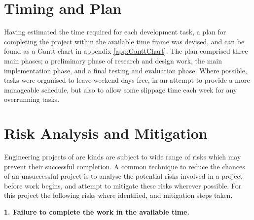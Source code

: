 
\section{Timing and Plan}

Having estimated the time required for each development task, a plan for completing the project within the available time frame was devised, and can be found as a Gantt chart in appendix \ref{app:GanttChart}. The plan comprised three main phases; a preliminary phase of research and design work, the main implementation phase, and a final testing and evaluation phase. Where possible, tasks were organised to leave weekend days free, in an attempt to provide a more manageable schedule, but also to allow some slippage time each week for any overrunning tasks.


\section{Risk Analysis and Mitigation}

Engineering projects of are kinds are subject to wide range of risks which may prevent their successful completion. A common technique to reduce the chances of an unsuccessful project is to analyse the potential risks involved in a project before work begins, and attempt to mitigate these risks wherever possible. For this project the following risks where identified, and mitigation steps taken.

\textbf{1. Failure to complete the work in the available time.}

